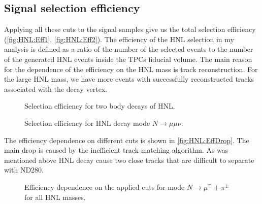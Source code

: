 \documentclass[../main.tex]{subfiles}
\begin{document}
\subsection{Signal selection efficiency}
\label{sec:HNL:eff}

Applying all these cuts to the signal samples give us the total selection efficiency (\autoref{fig:HNL:Eff1}, \autoref{fig:HNL:Eff2}). The efficiency of the HNL selection in my analysis is defined as a ratio of the number of the selected events to the number of the generated HNL events inside the TPCs fiducial volume. The main reason for the dependence of the efficiency on the HNL mass is track reconstruction. For the large HNL mass, we have more events with successfully reconstructed tracks associated with the decay vertex.

\begin{figure}[!ht]
  \begin{minipage}{0.49\linewidth}
  \end{minipage}
  \hfill
  \begin{minipage}{0.49\linewidth}
  \end{minipage}
  \caption{Selection efficiency for two body decays of HNL.}
  \label{fig:HNL:Eff1}
\end{figure}

\begin{figure}[!ht]
  \caption{Selection efficiency for HNL decay mode $N\to\mu\mu\nu$.}
  \label{fig:HNL:Eff2}
\end{figure}

The efficiency dependence on different cuts is shown in \autoref{fig:HNL:EffDrop}. The main drop is caused by the inefficient track matching algorithm. As was mentioned above HNL decay cause two close tracks that are difficult to separate with ND280.

\begin{figure}[!ht]
  \caption{Efficiency dependence on the applied cuts for mode $N\to\mu^\mp+\pi^\pm$ for all HNL masses.}
  \label{fig:HNL:EffDrop}
\end{figure}
\end{document}
